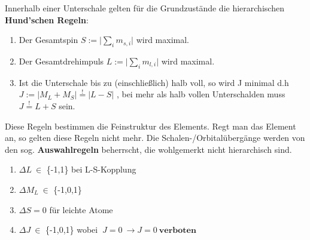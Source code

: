 \documentclass[Ex4_Zusammenfassung.tex]{subfiles}
\begin{document}
Innerhalb einer Unterschale gelten für die Grundzustände die hierarchischen \textbf{Hund'schen Regeln}: 
\begin{enumerate}
\item Der Gesamtspin  $ S := \lvert \sum_{i} m_{s,i} \rvert $  wird maximal.
\item Der Gesamtdrehimpuls $ L:=  \lvert \sum_{i} m_{l,i} \rvert $ wird maximal.
\item Ist die Unterschale bis zu (einschließlich) halb voll, so wird J minimal d.h \\  $ J := \lvert M_L + M_S \rvert \stackrel{!}{=} \lvert L-S \rvert $ , bei mehr als halb vollen Unterschalden muss $ J \stackrel{!}{=} L+S $ sein. 
\end{enumerate} 

Diese Regeln bestimmen die Feinstruktur des Elements. Regt man das Element an, so gelten diese Regeln nicht mehr. Die Schalen-/Orbitalübergänge werden von den sog. \textbf{Auswahlregeln} beherrscht, die wohlgemerkt nicht hierarchisch sind. 
\begin{enumerate}
\item $ \Delta L \  \in $ \{-1,1\}  bei L-S-Kopplung
\item $ \Delta M_L \   \in  $ \{-1,0,1\}  
\item $ \Delta S =0 $ für leichte Atome
\item $\Delta J \  \in $  \{-1,0,1\}   wobei $ \ J =0 \  \rightarrow J=0 \  \textbf{verboten} $
\end{enumerate}
\end{document}
